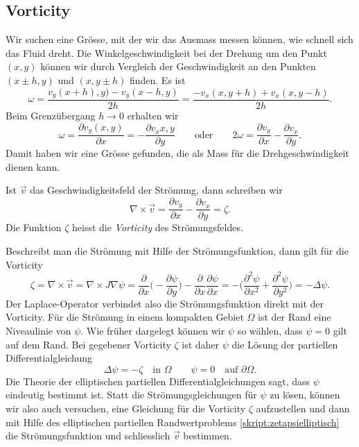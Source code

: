 \subsection{Vorticity}
Wir suchen eine Grösse, mit der wir das Ausmass messen können, wie schnell
sich das Fluid dreht.
Die Winkelgeschwindigkeit bei der Drehung um den Punkt $(x,y)$ können wir
durch Vergleich der Geschwindigkeit an den Punkten $(x\pm h,y)$ und
$(x,y\pm h)$ finden.
Es ist
\[
\omega
=
\frac{v_y(x+h),y) - v_y(x-h,y)}{2h}
=
\frac{-v_x(x,y+h) + v_x(x,y-h)}{2h}.
\]
Beim Grenzübergang $h\to 0$ erhalten wir
\[
\omega
=
\frac{\partial v_y(x,y)}{\partial x}
=
-\frac{\partial v_x{x,y}}{\partial y}
\qquad\text{oder}\qquad
2\omega
=
\frac{\partial v_y}{\partial x}-\frac{\partial v_x}{\partial y}.
\]
Damit haben wir eine Grösse gefunden, die als Mass für die Drehgeschwindigkeit
dienen kann.
\begin{definition}
Ist $\vec{v}$ das Geschwindigkeitsfeld der Strömung, dann schreiben wir
\[
\nabla\times\vec{v}
=
\frac{\partial v_y}{\partial x}-\frac{\partial v_x}{\partial y}
=
\zeta.
\]
Die Funktion $\zeta$ heisst die {\em Vorticity} des Strömungsfeldes.
\end{definition}

Beschreibt man die Strömung mit Hilfe der Strömungsfunktion, dann gilt
für die Vorticity
\begin{equation}
\zeta
=
\nabla\times\vec{v}
=
\nabla\times J\nabla\psi
=
\frac{\partial}{\partial x}
\biggl(-\frac{\partial\psi}{\partial y}\biggr)
-
\frac{\partial}{\partial x}
\frac{\partial\psi}{\partial x}
=
-\biggl(
\frac{\partial^2\psi}{\partial x^2}
+
\frac{\partial^2\psi}{\partial y^2}
\biggr)
=
-\Delta \psi.
\label{skript:stroemung-vorticity}
\end{equation}
Der Laplace-Operator verbindet also die Strömungsfunktion direkt mit der
Vorticity.
Für die Strömung in einem kompakten Gebiet $\Omega$ ist der Rand eine
Niveaulinie von $\psi$.
Wie früher dargelegt können wir $\psi$ so wählen, dass $\psi=0$ gilt auf
dem Rand.
Bei gegebener Vorticity $\zeta$ ist daher $\psi$ die Lösung der
partiellen Differentialgleichung
\begin{equation}
\Delta \psi = -\zeta\quad\text{in $\Omega$}
\qquad
\psi = 0\quad\text{auf $\partial\Omega$}.
\label{skript:zetapsielliptisch}
\end{equation}
Die Theorie der elliptischen partiellen Differentialgleichungen 
sagt, dass $\psi$ eindeutig bestimmt ist.
Statt die Strömungsgleichungen für $\psi$ zu lösen, können wir
also auch versuchen, eine Gleichung für die Vorticity $\zeta$
aufzustellen und dann mit Hilfe des elliptischen partiellen
Randwertproblems \eqref{skript:zetapsielliptisch} die Strömungsfunktion
und schliesslich $\vec{v}$ bestimmen.

